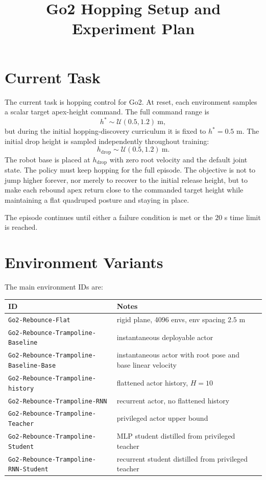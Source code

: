 \documentclass[11pt, a4paper]{article}
\title{Go2 Hopping Setup and Experiment Plan}
\date{}
\begin{document}
\maketitle

\section{Current Task}

The current task is hopping control for Go2. At reset, each
environment samples a scalar target apex-height command. The full command
range is
\begin{equation}
    h^{*} \sim \mathcal{U}(0.5, 1.2)\ \mathrm{m},
\end{equation}
but during the initial hopping-discovery curriculum it is fixed to
$h^*=0.5$ m. The initial drop height is sampled independently throughout
training:
\begin{equation}
    h_{\mathrm{drop}} \sim \mathcal{U}(0.5, 1.2)\ \mathrm{m}.
\end{equation}
The robot base is placed at $h_{\mathrm{drop}}$ with zero root velocity and the
default joint state. The policy must keep hopping for the full episode. The
objective is not to jump higher forever, nor merely to recover to the initial
release height, but to make each rebound apex return close to the commanded
target height while maintaining a flat quadruped posture and staying in place.

The episode continues until either a failure condition is met or the $20$ s time limit is reached.

\section{Environment Variants}

The main environment IDs are:
\begin{center}
\begin{tabular}{lll}
\hline
ID & Notes \\
\hline
\texttt{Go2-Rebounce-Flat} & rigid plane, 4096 envs, env spacing $2.5$ m \\
\texttt{Go2-Rebounce-Trampoline-Baseline} & instantaneous deployable actor \\
\texttt{Go2-Rebounce-Trampoline-Baseline-Base} & instantaneous actor with root pose and base linear velocity \\
\texttt{Go2-Rebounce-Trampoline-history} & flattened actor history, $H=10$ \\
\texttt{Go2-Rebounce-Trampoline-RNN} & recurrent actor, no flattened history \\
\texttt{Go2-Rebounce-Trampoline-Teacher} & privileged actor upper bound \\
\texttt{Go2-Rebounce-Trampoline-Student} & MLP student distilled from privileged teacher \\
\texttt{Go2-Rebounce-Trampoline-RNN-Student} & recurrent student distilled from privileged teacher \\
\hline
\end{tabular}
\end{center}
\end{document}
